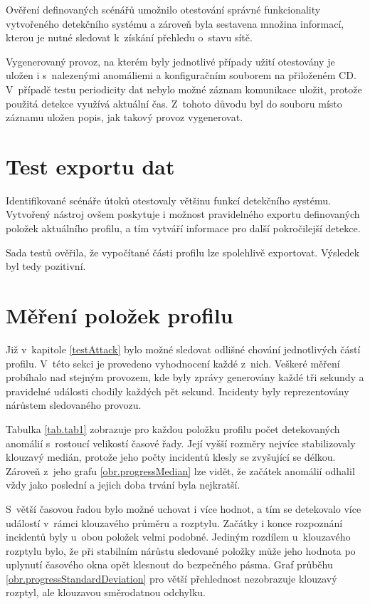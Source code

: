   Ověření definovaných scénářů umožnilo otestování správné funkcionality vytvořeného detekčního
  systému a zároveň byla sestavena množina informací, kterou je nutné sledovat k~získání 
  přehledu o~stavu sítě.
  
  Vygenerovaný provoz, na kterém byly jednotlivé případy užití otestovány je uložen i s~nalezenými
  anomáliemi a konfiguračním souborem na přiloženém CD. V~případě testu periodicity dat nebylo možné záznam 
  komunikace uložit, protože použitá detekce využívá aktuální čas. Z~tohoto důvodu 
  byl do souboru místo záznamu uložen popis, jak takový provoz vygenerovat.

\section{Test exportu dat}
Identifikované scénáře útoků otestovaly většinu funkcí detekčního systému. Vytvořený nástroj
ovšem poskytuje i možnost pravidelného exportu definovaných položek aktuálního profilu, a tím 
vytváří informace pro další pokročilejší detekce. 

Sada testů ověřila, že vypočítané části profilu lze spolehlivě exportovat. Výsledek byl tedy
pozitivní.

\section{Měření položek profilu}
Již v~kapitole \ref{testAttack} bylo možné sledovat odlišné chování 
jednotlivých částí profilu. V~této sekci je provedeno vyhodnocení každé z~nich. Veškeré 
měření probíhalo nad stejným provozem, kde byly zprávy generovány každé tři sekundy a pravidelné
události chodily každých pět sekund. Incidenty byly reprezentovány nárůstem sledovaného provozu.

Tabulka \ref{tab.tab1} zobrazuje pro každou položku profilu počet detekovaných anomálií 
s~rostoucí velikostí časové řady. Její vyšší rozměry nejvíce stabilizovaly klouzavý medián, protože jeho počty
incidentů klesly se zvyšující se délkou. Zároveň z~jeho grafu \ref{obr.progressMedian} lze vidět,
že začátek anomálií odhalil vždy jako poslední a jejich doba trvání byla nejkratší. 

S~větší časovou řadou bylo možné uchovat i více hodnot, a 
tím se detekovalo více událostí v~rámci klouzavého průměru a rozptylu. Začátky i konce rozpoznání incidentů
byly u~obou položek velmi podobné. Jediným rozdílem u~klouzavého rozptylu bylo, že při stabilním 
nárůstu sledované položky může jeho hodnota po uplynutí časového okna opět klesnout do bezpečného pásma. 
Graf průběhu \ref{obr.progressStandardDeviation} pro větší přehlednost nezobrazuje klouzavý rozptyl, ale 
klouzavou směrodatnou odchylku. 

